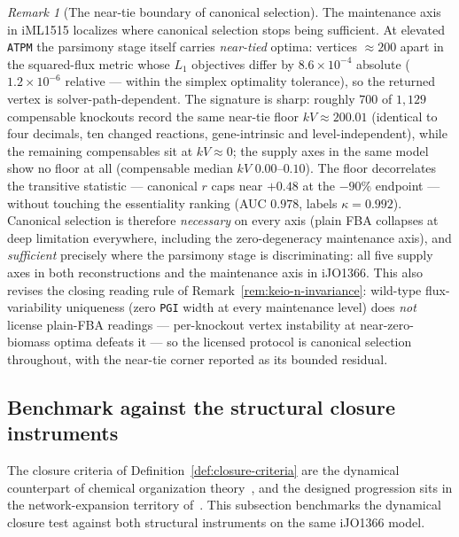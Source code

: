 \documentclass[11pt,a4paper]{article}
\theoremstyle{plain}
\theoremstyle{definition}
\theoremstyle{remark}
\newtheorem{remark}[theorem]{Remark}
\begin{document}
\begin{remark}[The near-tie boundary of canonical selection]
\label{rem:canonical-scope}
The maintenance axis in iML1515 localizes where canonical
selection stops being sufficient. At elevated \texttt{ATPM} the
parsimony stage itself carries \emph{near-tied} optima: vertices
$\approx200$ apart in the squared-flux metric whose $L_1$
objectives differ by $8.6\times10^{-4}$ absolute ($1.2\times10^{-6}$
relative --- within the simplex optimality tolerance), so the
returned vertex is solver-path-dependent. The signature is sharp:
roughly $700$ of $1{,}129$ compensable knockouts record the same
near-tie floor $kV\approx200.01$ (identical to four decimals, ten
changed reactions, gene-intrinsic and level-independent), while
the remaining compensables sit at $kV\approx0$; the supply axes in
the same model show no floor at all (compensable median $kV$
$0.00$--$0.10$). The floor decorrelates the transitive statistic
--- canonical $r$ caps near $+0.48$ at the $-90\%$ endpoint ---
without touching the essentiality ranking (AUC $0.978$, labels
$\kappa=0.992$). Canonical selection is therefore \emph{necessary}
on every axis (plain FBA collapses at deep limitation everywhere,
including the zero-degeneracy maintenance axis), and
\emph{sufficient} precisely where the parsimony stage is
discriminating: all five supply axes in both reconstructions and
the maintenance axis in iJO1366. This also revises the closing
reading rule of Remark~\ref{rem:keio-n-invariance}: wild-type
flux-variability uniqueness (zero \texttt{PGI} width at every
maintenance level) does \emph{not} license plain-FBA readings ---
per-knockout vertex instability at near-zero-biomass optima
defeats it --- so the licensed protocol is canonical selection
throughout, with the near-tie corner reported as its bounded
residual.
\end{remark}

\subsection{Benchmark against the structural closure instruments}
\label{sec:network-keio-e14}

The closure criteria of Definition~\ref{def:closure-criteria} are
the dynamical counterpart of chemical organization
theory~\citep{dittrich2007cot}, and the designed progression sits
in the network-expansion territory of~\citet{handorf2005network}.
This subsection benchmarks the dynamical closure test against both
structural instruments on the same iJO1366 model.
\end{document}
